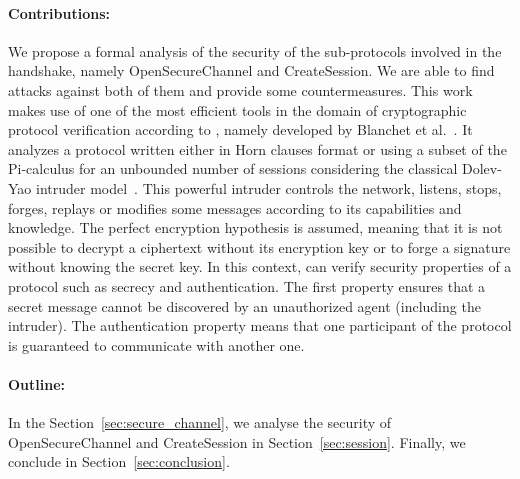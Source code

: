\paragraph{Contributions:}

We propose a formal analysis of the security of
the sub-protocols involved in the \opcua handshake, namely \opcua
OpenSecureChannel and \opcua CreateSession.  We are able to find
attacks against both of them and provide some countermeasures.  This
work makes use of one of the most efficient tools in the domain of
cryptographic protocol verification according to \cite{LP15},
namely \proverif developed by Blanchet et al.~\cite{Bla01}.  It
analyzes a protocol written either in Horn clauses format or using a
subset of the Pi-calculus for an unbounded number of sessions
considering the classical Dolev-Yao intruder model~\cite{DY81}.  This
powerful intruder controls the network, listens, stops, forges,
replays or modifies some messages according to its capabilities and
knowledge.  The perfect encryption hypothesis is assumed, meaning that
it is not possible to decrypt a ciphertext without its encryption key
or to forge a signature without knowing the secret key.  In this
context, \proverif can verify security properties of
a protocol such as secrecy and authentication.  The first property
ensures that a secret message cannot be discovered by an unauthorized
agent (including the intruder).  The authentication property means
that one participant of the protocol is guaranteed to communicate with
another one.

\paragraph{Outline:} In the Section~\ref{sec:secure_channel}, we analyse the
security of \opcua OpenSecureChannel and 
\opcua CreateSession in Section~\ref{sec:session}. Finally, we conclude in Section~\ref{sec:conclusion}.
